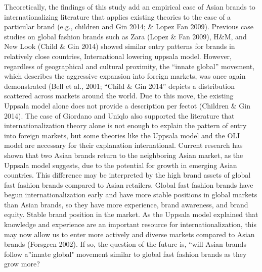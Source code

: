 \documentclass[]{article}
\begin{document}
Theoretically, the findings of this study add an empirical case of Asian
brands to internationalizing literature that applies existing theories
to the case of a particular brand (e.g., children and Gin 2014; \& Lopez
Fan 2009). Previous case studies on global fashion brands such as Zara
(Lopez \& Fan 2009), H\&M, and New Look (Child \& Gin 2014) showed
similar entry patterns for brands in relatively close countries,
International lowering uppsala model. However, regardless of
geographical and cultural proximity, the ``innate global'' movement,
which describes the aggressive expansion into foreign markets, was once
again demonstrated (Bell et al., 2001; ``Child \& Gin 2014'' depicts a
distribution scattered across markets around the world. Due to this
move, the existing Uppsala model alone does not provide a description
per fectot (Children \& Gin 2014). The case of Giordano and Uniqlo also
supported the literature that internationalization theory alone is not
enough to explain the pattern of entry into foreign markets, but some
theories like the Uppsala model and the OLI model are necessary for
their explanation international. Current research has shown that two
Asian brands return to the neighboring Asian market, as the Uppsala
model suggests, due to the potential for growth in emerging Asian
countries. This difference may be interpreted by the high brand assets
of global fast fashion brands compared to Asian retailers. Global fast
fashion brands have begun internationalization early and have more
stable positions in global markets than Asian brands, so they have more
experience, brand awareness, and brand equity. Stable brand position in
the market. As the Uppsala model explained that knowledge and experience
are an important resource for internationalization, this may now allow
us to enter more actively and diverse markets compared to Asian brands
(Forsgren 2002). If so, the question of the future is, ``will Asian
brands follow a''innate global" movement similar to global fast fashion
brands as they grow more?
\end{document}
